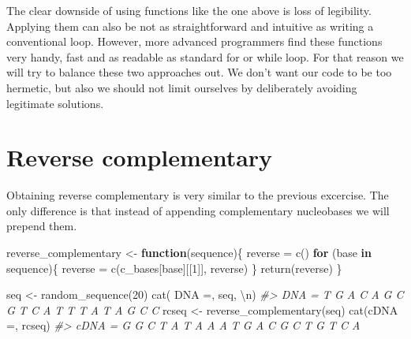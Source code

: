 \documentclass[
]{book}
\newenvironment{Shaded}{\begin{snugshade}}{\end{snugshade}}
\newcommand{\CommentTok}[1]{\textcolor[rgb]{0.56,0.35,0.01}{\textit{#1}}}
\newcommand{\ControlFlowTok}[1]{\textcolor[rgb]{0.13,0.29,0.53}{\textbf{#1}}}
\newcommand{\DecValTok}[1]{\textcolor[rgb]{0.00,0.00,0.81}{#1}}
\newcommand{\FunctionTok}[1]{\textcolor[rgb]{0.00,0.00,0.00}{#1}}
\newcommand{\NormalTok}[1]{#1}
\newcommand{\OtherTok}[1]{\textcolor[rgb]{0.56,0.35,0.01}{#1}}
\newcommand{\SpecialCharTok}[1]{\textcolor[rgb]{0.00,0.00,0.00}{#1}}
\newcommand{\StringTok}[1]{\textcolor[rgb]{0.31,0.60,0.02}{#1}}
\begin{document}
The clear downside of using functions like the one above is loss of legibility. Applying them can also be not as straightforward and intuitive as writing a conventional loop. However, more advanced programmers find these functions very handy, fast and as readable as standard for or while loop. For that reason we will try to balance these two approaches out. We don't want our code to be too hermetic, but also we should not limit ourselves by deliberately avoiding legitimate solutions.

\hypertarget{reverse-complementary}{%
\section{Reverse complementary}\label{reverse-complementary}}

Obtaining reverse complementary is very similar to the previous excercise. The only difference is that instead of appending complementary nucleobases we will prepend them.

\begin{Shaded}
\begin{Highlighting}[]
\NormalTok{reverse\_complementary }\OtherTok{\textless{}{-}} \ControlFlowTok{function}\NormalTok{(sequence)\{}
\NormalTok{  reverse }\OtherTok{=} \FunctionTok{c}\NormalTok{()}
  \ControlFlowTok{for}\NormalTok{ (base }\ControlFlowTok{in}\NormalTok{ sequence)\{}
\NormalTok{    reverse }\OtherTok{=} \FunctionTok{c}\NormalTok{(c\_bases[base][[}\DecValTok{1}\NormalTok{]], reverse)}
\NormalTok{  \}}
  \FunctionTok{return}\NormalTok{(reverse)}
\NormalTok{\}}
\end{Highlighting}
\end{Shaded}

\begin{Shaded}
\begin{Highlighting}[]
\NormalTok{seq }\OtherTok{\textless{}{-}} \FunctionTok{random\_sequence}\NormalTok{(}\DecValTok{20}\NormalTok{)}
\FunctionTok{cat}\NormalTok{(}\StringTok{\textquotesingle{} DNA =\textquotesingle{}}\NormalTok{, seq, }\StringTok{\textquotesingle{}}\SpecialCharTok{\textbackslash{}n}\StringTok{\textquotesingle{}}\NormalTok{)}
\CommentTok{\#\textgreater{}  DNA = T G A C A G C G T C A T T T A T A G C C}
\NormalTok{rcseq }\OtherTok{\textless{}{-}} \FunctionTok{reverse\_complementary}\NormalTok{(seq)}
\FunctionTok{cat}\NormalTok{(}\StringTok{\textquotesingle{}cDNA =\textquotesingle{}}\NormalTok{, rcseq)}
\CommentTok{\#\textgreater{} cDNA = G G C T A T A A A T G A C G C T G T C A}
\end{Highlighting}
\end{Shaded}
\end{document}

